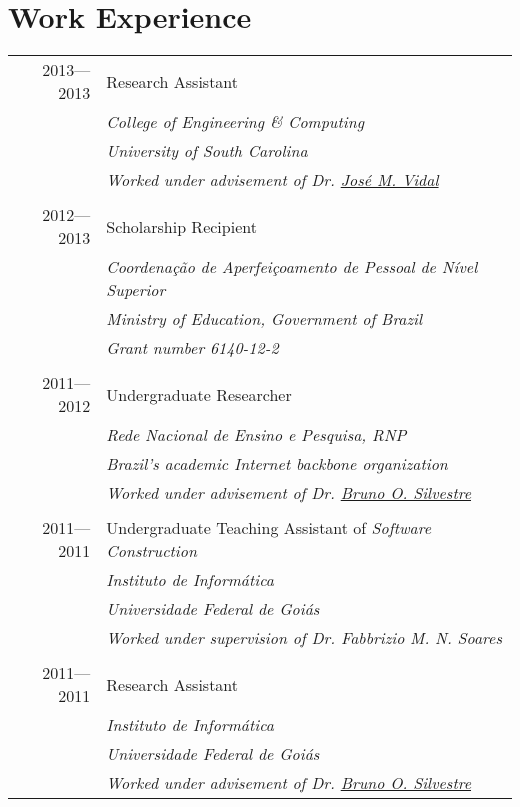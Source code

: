 \documentclass[a4paper,10pt]{article}
\begin{document}
\section{Work Experience}
\begin{tabular}{r|p{11cm}}
  \textsc{2013---2013}
  & Research Assistant\\
  &\emph{College of Engineering \& Computing}\\
  &\emph{University of South Carolina}\\
  &\emph{Worked under advisement of Dr. \href{http://jmvidal.cse.sc.edu}{José M. Vidal}}
  \\\multicolumn{2}{c}{} \\
  \textsc{2012---2013}
  & Scholarship Recipient\\
  & \emph{Coordenação de Aperfeiçoamento de Pessoal de Nível Superior} \\
  & \emph{Ministry of Education, Government of Brazil}\\
  & \emph{Grant number 6140-12-2}
  \\\multicolumn{2}{c}{} \\
  \textsc{2011---2012}
  & Undergraduate Researcher\\
  &\emph{Rede Nacional de Ensino e Pesquisa, RNP}\\
  &\emph{Brazil's academic Internet backbone organization}\\
  &\emph{Worked under advisement of Dr. \href{http://inf.ufg.br/~brunoos/}{Bruno O. Silvestre}}
  \\\multicolumn{2}{c}{} \\
  \textsc{2011---2011}
  & Undergraduate Teaching Assistant of \emph{Software Construction}\\
  &\emph{Instituto de Informática}\\
  &\emph{Universidade Federal de Goiás}\\
  &\emph{Worked under supervision of Dr. Fabbrizio M. N. Soares}
  \\\multicolumn{2}{c}{} \\
  \textsc{2011---2011}
  & Research Assistant\\
  &\emph{Instituto de Informática}\\
  &\emph{Universidade Federal de Goiás}\\
  &\emph{Worked under advisement of Dr. \href{http://inf.ufg.br/~brunoos/}{Bruno O. Silvestre}}
\end{tabular}
\end{document}
